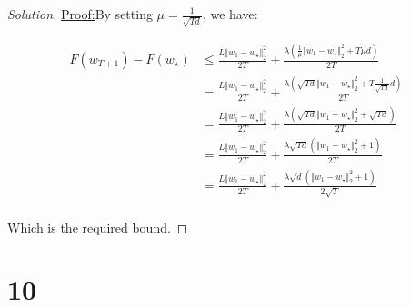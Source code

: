 \documentclass{article}
\newenvironment{solution}
  {\renewcommand\qedsymbol{$\blacksquare$}\begin{proof}[Solution]}
  {\end{proof}}
\newenvironment{claimproof}[1]{\par\noindent\underline{Proof:}\space#1}{}
\begin{document}
\begin{solution}
\begin{claimproof}
        By setting $\mu = \frac{1}{\sqrt{Td}}$, we have:

        \begin{align*}
            F(w_{T+1}) - F(w_\star) 
            &\leq \frac{L \Vert w_1 - w_\star \Vert^2_2}{2T} + \frac{\lambda \left( \frac{1}{\mu} \Vert w_1 - w_\star \Vert^2_2 + T \mu d \right)}{2T} \\
            &= \frac{L \Vert w_1 - w_\star \Vert^2_2}{2T} + \frac{\lambda \left( \sqrt{Td} \Vert w_1 - w_\star \Vert^2_2 + T \frac{1}{\sqrt{Td}} d \right)}{2T} \\
            &= \frac{L \Vert w_1 - w_\star \Vert^2_2}{2T} + \frac{\lambda \left( \sqrt{Td} \Vert w_1 - w_\star \Vert^2_2 + \sqrt{Td} \right)}{2T} \\
            &= \frac{L \Vert w_1 - w_\star \Vert^2_2}{2T} + \frac{\lambda \sqrt{Td} \left( \Vert w_1 - w_\star \Vert^2_2 + 1 \right)}{2T} \\
            &= \frac{L \Vert w_1 - w_\star \Vert^2_2}{2T} + \frac{\lambda \sqrt{d} \left( \Vert w_1 - w_\star \Vert^2_2 + 1 \right)}{2\sqrt{T}} \\
        \end{align*}
        
        Which is the required bound.
    \end{claimproof}
\end{solution}

\section*{10}
\end{document}
